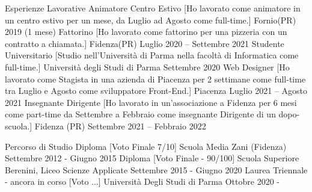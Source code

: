 \documentclass[]{llresume}
\begin{document}
\makeheader
\begin{mainpane}
    \begin{mainsection}{Esperienze Lavorative}
        \entryJob
            {Animatore Centro Estivo}
            [Ho lavorato come animatore in un centro estivo per un mese, da Luglio ad Agosto come full-time.]
            {Fornio(PR)}
            {2019 (1 mese)}
        \entryJob
            {Fattorino}
            [Ho lavorato come fattorino per una pizzeria con un contratto a chiamata.]
            {Fidenza(PR)}
            {Luglio 2020 -- Settembre 2021}
        \entryJob
            {Studente Universitario}
            [Studio nell'Università di Parma nella facoltà di Informatica come full-time.]
            {Università degli Studi di Parma}
            {Settembre 2020}   
        \entryJob
            {Web Designer}
            [Ho lavorato come Stagista in una azienda di Piacenza per 2 settimane come full-time tra Luglio e Agosto come sviluppatore Front-End.]
            {Piacenza}
            {Luglio 2021 -- Agosto 2021} 
        \entryJob
            {Insegnante Dirigente}
            [Ho lavorato in un'associazione a Fidenza per 6 mesi come part-time da Settembre a Febbraio come insegnante Dirigente di un dopo-scuola.]
            {Fidenza (PR)}
            {Settembre 2021 -- Febbraio 2022}
    \end{mainsection}


    \begin{mainsection}{Percorso di Studio}
        \entryJob
            {Diploma}
            [Voto Finale 7/10]
            {Scuola Media Zani (Fidenza)}
            {Settembre 2012 - Giugno 2015}
        \entryJob
            {Diploma}
            [Voto Finale - 90/100]
            {Scuola Superiore Berenini,
            Liceo Scienze Applicate}
            {Settembre 2015 - Giugno 2020}
        \entryJob
            {Laurea Triennale - ancora in corso}
            [Voto ...]
            {Università Degli Studi di Parma}
            {Ottobre 2020 - }
    \end{mainsection} 


\end{mainpane}
\end{document}
